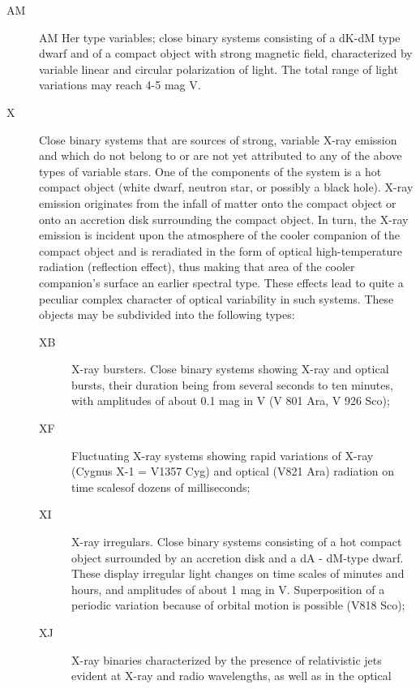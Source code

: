 \begin{description}
\item[AM]    AM Her type variables; close binary systems consisting of
	         a dK-dM type dwarf and of a compact object with strong magnetic field,
	         characterized by variable linear and circular polarization of light. The
             total range of light variations may reach 4-5 mag V.
\item[X]     Close binary systems that are sources of strong, variable
             X-ray emission and which do not belong to or are not yet attributed to
             any of the above types of variable stars. One of the components of the
             system is a hot compact object (white dwarf, neutron star, or possibly a
             black hole). X-ray emission originates from the infall of matter onto
             the compact object or onto an accretion disk surrounding the compact
             object. In turn, the X-ray emission is incident upon the atmosphere of
             the cooler companion of the compact object and is reradiated in the form
             of optical high-temperature radiation (reflection effect), thus making
             that area of the cooler companion's surface an earlier spectral type.
             These effects lead to quite a peculiar complex character of optical
             variability in such systems. These objects may be subdivided into the
             following types:
	\begin{description}
\item[XB]    X-ray bursters. Close binary systems showing X-ray and
             optical bursts, their duration being from several seconds to ten
             minutes, with amplitudes of about 0.1 mag in V (V 801 Ara, V 926 Sco);
\item[XF]    Fluctuating X-ray systems showing rapid variations of X-ray
             (Cygnus X-1 = V1357 Cyg) and optical (V821 Ara) radiation on time scalesof dozens of milliseconds;
\item[XI]    X-ray irregulars. Close binary systems consisting of a hot
             compact object surrounded by an accretion disk and a dA - dM-type dwarf.
             These display irregular light changes on time scales of minutes and
             hours, and amplitudes of about 1 mag in V. Superposition of a periodic
             variation because of orbital motion is possible (V818 Sco);
\item[XJ]    X-ray binaries characterized by the presence of relativistic
             jets evident at X-ray and radio wavelengths, as well as in the optical

\end{description}
\end{description}
